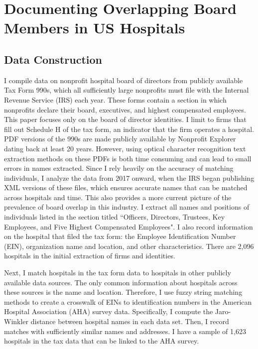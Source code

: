 \documentclass[12pt]{article}
\begin{document}
    


    

    \section{Documenting Overlapping Board Members in US Hospitals}\label{sec:document}

    \subsection{Data Construction}

    
   I compile data on nonprofit hospital board of directors from publicly available Tax Form 990s, which all sufficiently large nonprofits must file with the Internal Revenue Service (IRS) each year. These forms contain a section in which nonprofits declare their board, executives, and highest compensated employees. This paper focuses only on the board of director identities. I limit to firms that fill out Schedule H of the tax form, an indicator that the firm operates a hospital. PDF versions of the 990s are made publicly available by Nonprofit Explorer dating back at least 20 years. However, using optical character recognition text extraction methods on these PDFs is both time consuming and can lead to small errors in names extracted. Since I rely heavily on the accuracy of matching individuals, I analyze the data from 2017 onward, when the IRS began publishing XML versions of these files, which ensures accurate names that can be matched across hospitals and time. This also provides a more current picture of the prevalence of board overlap in this industry. I extract all names and positions of individuals listed in the section titled ``Officers, Directors, Trustees, Key Employees, and Five Highest Compensated Employees". I also record information on the hospital that filed the tax form: the Employee Identification Number (EIN), organization name and location, and other characteristics. There are 2,096 hospitals in the initial extraction of firms and identities.

   Next, I match hospitals in the tax form data to hospitals in other publicly available data sources. The only common information about hospitals across these sources is the name and location. Therefore, I use fuzzy string matching methods to create a crosswalk of EINs to identification numbers in the American Hospital Association (AHA) survey data. Specifically, I compute the Jaro-Winkler distance between hospital names in each data set. Then, I record matches with sufficiently similar names and addresses. I have a sample of 1,623 hospitals in the tax data that can be linked to the AHA survey. 
\end{document}
